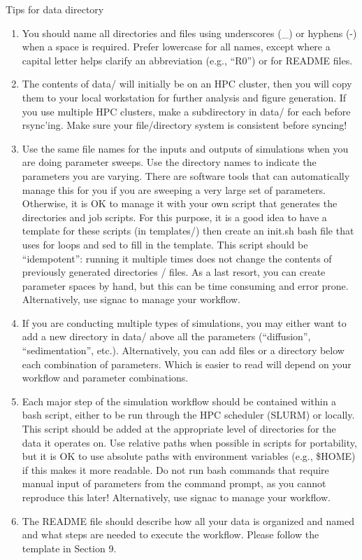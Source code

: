 \documentclass{article}
\begin{document}
Tips for data directory
\begin{enumerate}
  \item You should name all directories and files using underscores (\_) or hyphens (-) when a space
is required. Prefer lowercase for all names, except where a capital letter helps clarify an
abbreviation (e.g., “R0”) or for README files.
\item The contents of data/ will initially be on an HPC cluster, then you will copy them to your local
workstation for further analysis and figure generation. If you use multiple HPC clusters, make
a subdirectory in data/ for each before rsync’ing. Make sure your file/directory system is consistent before syncing!
\item Use the same file names for the inputs and outputs of simulations when you are doing
parameter sweeps. Use the directory names to indicate the parameters you are varying. There
are software tools that can automatically manage this for you if you are sweeping a very large
set of parameters. Otherwise, it is OK to manage it with your own script that generates the
directories and job scripts. For this purpose, it is a good idea to have a template for these
scripts (in templates/) then create an init.sh bash file that uses for loops and sed to fill in the
template. This script should be “idempotent”: running it multiple times does
not change the contents of previously generated directories / files. As a last resort, you can
create parameter spaces by hand, but this can be time consuming and error prone.
Alternatively, use signac to manage your workflow. 
\item If you are conducting multiple types of simulations, you may either want to add a new directory
in data/ above all the parameters (“diffusion”, “sedimentation”, etc.). Alternatively, you can add
files or a directory below each combination of parameters. Which is easier to read will depend
on your workflow and parameter combinations.
\item Each major step of the simulation workflow should be contained within a bash script, either to
be run through the HPC scheduler (SLURM) or locally. This script should be added at the
appropriate level of directories for the data it operates on. Use relative paths when possible
in scripts for portability, but it is OK to use absolute paths with environment variables (e.g.,
\$HOME) if this makes it more readable. Do not run bash commands that require manual input
of parameters from the command prompt, as you cannot reproduce this later!
Alternatively, use signac to manage your workflow. 
\item The README file should describe how all your data is organized and named and what steps
are needed to execute the workflow. Please follow the template in Section 9.
\end{enumerate}
\end{document}
